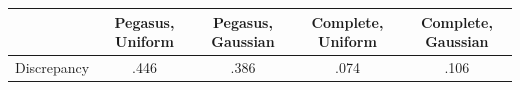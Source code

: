 \documentclass[12pt]{article}
\newcommand{\1}{\mathbf{1}}
\theoremstyle{remark}
\theoremstyle{definition}
\theoremstyle{proposition}
\theoremstyle{lemma}
\theoremstyle{definition}
\begin{document}
	\begin{figure}[!htbp]
		\centering
		 \\
		 \\
	\end{figure}

\begin{center}
\begin{tabular}{c|c|c|c|c}
	& Pegasus, Uniform & Pegasus, Gaussian & Complete, Uniform & Complete, Gaussian \\
	\hline
	Discrepancy & .446 &   .386 & .074 & .106 \\
	\end{tabular}
\end{center}
	
	 
	
	
	
\end{document}

